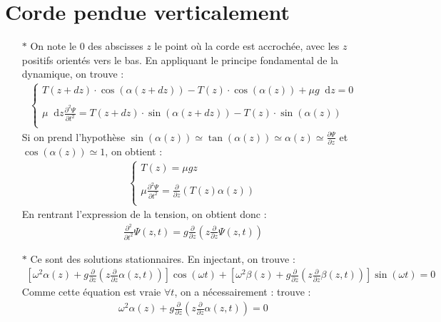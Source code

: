 \documentclass{report}
\newcommand*\dif{\mathop{}\!\mathrm{d}}
\begin{document}
\section*{Corde pendue verticalement}

\begin{itemize}

	\item[$\ast$] On note le 0 des abscisses $z$ le point où la corde est accrochée, avec les $z$ positifs orientés vers le bas. En appliquant le principe fondamental de la dynamique, on trouve :
	\begin{align*}
	\left\lbrace
	\begin{array}{ccc}
	T(z+dz)\cdot\cos(\alpha(z+dz))-T(z)\cdot\cos(\alpha(z))+\mu g\dif z=0\\
	\\
	\mu\dif z\frac{\partial^2\Psi}{\partial t^2}=T(z+dz)\cdot\sin(\alpha(z+dz))-T(z)\cdot\sin(\alpha(z))\\
	\end{array}\right.
	\end{align*}		
	Si on prend l'hypothèse $\sin(\alpha(z))\simeq\tan(\alpha(z))\simeq\alpha(z)\simeq\frac{\partial \Psi}{\partial z}$ et $\cos(\alpha(z))\simeq1$, on obtient :
	\begin{align*}
	\left\lbrace
	\begin{array}{ccc}
	T(z)=\mu gz\\
	\\
	\mu\frac{\partial^2\Psi}{\partial t^2}=\frac{\partial}{\partial z}(T(z)\alpha(z))\\
	\end{array}\right.
	\end{align*}		
	En rentrant l'expression de la tension, on obtient donc :
	\begin{align*}
		\frac{\partial^2}{\partial t^2}\Psi(z,t)=g\frac{\partial}{\partial z}\left( z\frac{\partial}{\partial z}\Psi(z,t)\right) 
	\end{align*}
	
		\item[$\ast$] Ce sont des solutions stationnaires. En injectant, on trouve :
		\begin{align*}
			\left[ \omega^2\alpha(z)+g\frac{\partial}{\partial z}\left( z\frac{\partial}{\partial z}\alpha(z,t)\right)\right] \cos(\omega t)+\left[ \omega^2\beta(z)+g\frac{\partial}{\partial z}\left( z\frac{\partial}{\partial z}\beta(z,t)\right)\right] \sin(\omega t)=0
		\end{align*}
		Comme cette équation est vraie $\forall t$, on a nécessairement :
trouve :
		\begin{align*}
			\omega^2\alpha(z)+g\frac{\partial}{\partial z}\left( z\frac{\partial}{\partial z}\alpha(z,t)\right)=0
		\end{align*}		
		

\end{itemize}
\end{document}
